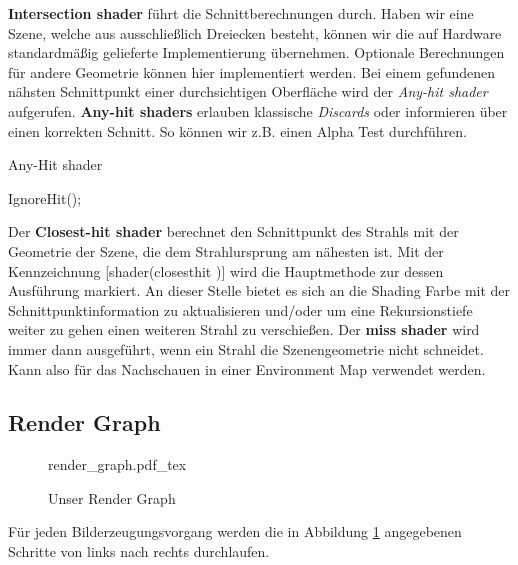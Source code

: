 \textbf{Intersection shader} führt die Schnittberechnungen durch.
Haben wir eine Szene, welche aus ausschließlich Dreiecken besteht, können wir
die auf Hardware standardmäßig gelieferte Implementierung übernehmen. 
Optionale Berechnungen für andere Geometrie können hier implementiert werden.
Bei einem gefundenen nähsten Schnittpunkt einer durchsichtigen Oberfläche wird der 
\textit{Any-hit shader} aufgerufen.
\textbf{Any-hit shaders} erlauben klassische \textit{Discards} oder informieren
über einen korrekten Schnitt. So können wir z.B. einen Alpha Test durchführen.

\begin{algorithm}[H]
    \caption{Any-Hit shader}
    \begin{algorithmic}[1]
        \State IgnoreHit();
        \EndIf
    \end{algorithmic}
    \label{alg:any hit}
\end{algorithm}

Der \textbf{Closest-hit shader} berechnet den Schnittpunkt des Strahls mit der Geometrie
der Szene, die dem Strahlursprung am nähesten ist.
Mit der Kennzeichnung [shader(\dq closesthit \dq)] wird die Hauptmethode zur 
dessen Ausführung markiert. An dieser Stelle bietet es sich an die Shading Farbe 
mit der Schnittpunktinformation zu aktualisieren und/oder um eine Rekursionstiefe weiter 
zu gehen einen weiteren Strahl zu verschießen. 
Der \textbf{miss shader} wird immer dann ausgeführt, wenn ein Strahl die
Szenengeometrie nicht schneidet. Kann also für das Nachschauen in einer 
Environment Map verwendet werden. 

\subsection{Render Graph}

\begin{figure}[H]
    \begin{tcolorbox}
    \centering
    \def\svgwidth{\columnwidth}
    {render_graph.pdf_tex}
    \end{tcolorbox}
    \caption{Unser Render Graph}
    \label{pic:Render Graph}
\end{figure}

Für jeden Bilderzeugungsvorgang werden die in Abbildung \ref{pic:Render Graph} angegebenen Schritte von links nach rechts 
durchlaufen.








